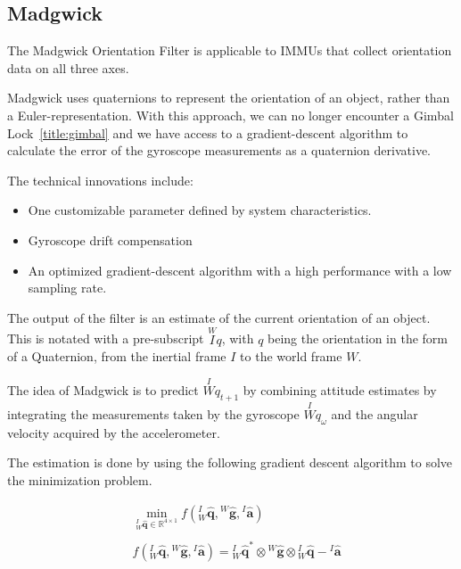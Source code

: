 \subsection{Madgwick}\label{title:madgwick}
The Madgwick Orientation Filter is applicable to IMMUs that collect orientation data on all three axes.

Madgwick uses quaternions to represent the orientation of an object, rather than a Euler-representation. With this approach, we can no longer encounter a Gimbal Lock~\ref{title:gimbal} and we have access to a gradient-descent algorithm to calculate the error of the gyroscope measurements as a quaternion derivative.

The technical innovations include:

\begin{itemize}
    \item One customizable parameter defined by system characteristics.
    \item Gyroscope drift compensation
    \item An optimized gradient-descent algorithm with a high performance with a low sampling rate.
\end{itemize}

\noindent\cite{LRWeb:49}

The output of the filter is an estimate of the current orientation of an object. This is notated with a pre-subscript $\overset{W}{I}q$, with $q$ being the orientation in the form of a Quaternion, from the inertial frame $I$ to the world frame $W$.

The idea of Madgwick is to predict $\overset{I}{W}q_{t+1}$ by combining attitude estimates by integrating the measurements taken by the gyroscope $\overset{I}{W}q_\omega$ and the angular velocity acquired by the accelerometer.

The estimation is done by using the following gradient descent algorithm to solve the minimization problem.

\[
\begin{aligned}
&\min_{ {}^{I}_{W}\mathbf{\hat{q}} \in \mathbb{R}^{4 \times 1} } f\left( {}^{I}_{W}\mathbf{\hat{q}}, {}^{W}\mathbf{\hat{g}}, {}^{I}\mathbf{\hat{a}} \right) \\ \\
&f\left( {}^{I}_{W}\mathbf{\hat{q}}, {}^{W}\mathbf{\hat{g}}, {}^{I}\mathbf{\hat{a}} \right) = {}^{I}_{W}\mathbf{\hat{q}}^{*} \otimes {}^{W}\mathbf{\hat{g}} \otimes {}^{I}_{W}\mathbf{\hat{q}} - {}^{I}\mathbf{\hat{a}}
\end{aligned}
\]

